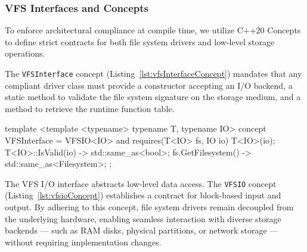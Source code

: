 \documentclass[a4paper,10pt,twoside]{report}
\theoremstyle{definition}
\begin{document}
\clearpage


\subsubsection{VFS Interfaces and Concepts}

To enforce architectural compliance at compile time, we utilize C++20 Concepts to define strict contracts for both file system drivers and low-level storage operations.

The \texttt{VFSInterface} concept (Listing~\ref{lst:vfsInterfaceConcept}) mandates that any compliant driver class must provide a constructor accepting an I/O backend, a static method to validate the file system signature on the storage medium, and a method to retrieve the runtime function table.

\begin{cppcode}[caption={VFSInterface Concept Definition}, label={lst:vfsInterfaceConcept}]
template <template <typename> typename T, typename IO>
concept VFSInterface = VFSIO<IO> and requires(T<IO> fs, IO io) {
    T<IO>(io);
    { T<IO>::IsValid(io) } -> std::same_as<bool>;
    { fs.GetFilesystem() } -> std::same_as<Filesystem>;
};
\end{cppcode}

The VFS I/O interface abstracts low-level data access. The \texttt{VFSIO} concept (Listing~\ref{lst:vfsioConcept}) establishes a contract for block-based input and output. By adhering to this concept, file system drivers remain decoupled from the underlying hardware, enabling seamless interaction with diverse storage backends --- such as RAM disks, physical partitions, or network storage --- without requiring implementation changes.
\end{document}
